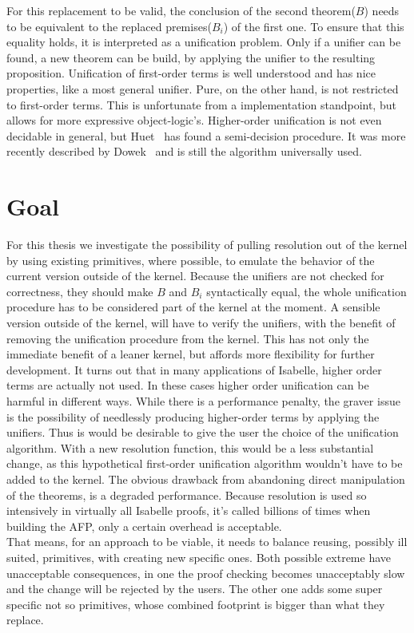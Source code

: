 For this replacement to be valid, the conclusion of the second theorem($B$) needs to be equivalent to the replaced premises($B_i$) of the first one. To ensure that this equality holds, it is interpreted as a unification problem. Only if a unifier can be found, a new theorem can be build, by applying the unifier to the resulting proposition. Unification of first-order terms is well understood and has nice properties, like a most general unifier. Pure, on the other hand, is not restricted to first-order terms. This is unfortunate from a implementation standpoint, but allows for more expressive object-logic's. Higher-order unification is not even decidable in general, but Huet~\parencite{Huet1975} has found a semi-decision procedure. It was more recently described by Dowek~\parencite{Dowek20011009} and is still the algorithm universally used.

\section{Goal}
For this thesis we investigate the possibility of pulling resolution out of the kernel by using existing primitives, where possible, to emulate the behavior of the current version outside of the kernel.\newline
Because the unifiers are not checked for correctness, they should make $B$ and $B_i$ syntactically equal, the whole unification procedure has to be considered part of the kernel at the moment. A sensible version outside of the kernel, will have to verify the unifiers, with the benefit of removing the unification procedure from the kernel. This has not only the immediate benefit of a leaner kernel, but affords more flexibility for further development.\newline
It turns out that in many applications of Isabelle, higher order terms are actually not used. In these cases higher order unification can be harmful in different ways. While there is a performance penalty, the graver issue is the possibility of needlessly producing higher-order terms by applying the unifiers. Thus is would be desirable to give the user the choice of the unification algorithm. With a new resolution function, this would be a less substantial change, as this hypothetical first-order unification algorithm wouldn't have to be added to the kernel.\newline
The obvious drawback from abandoning direct manipulation of the theorems, is a degraded performance. Because resolution is used so intensively in virtually all Isabelle proofs, it's called billions of times when building the AFP, only a certain overhead is acceptable.\\
That means, for an approach to be viable, it needs to balance reusing, possibly ill suited, primitives, with creating new specific ones. Both possible extreme have unacceptable consequences, in one the proof checking becomes unacceptably slow and the change will be rejected by the users. The other one adds some super specific not so primitives, whose combined footprint is bigger than what they replace.